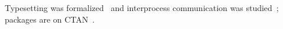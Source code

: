 \documentclass[11pt]{article}\usepackage[paperwidth=14cm,paperheight=8cm,margin=1cm]{geometry}\pagestyle{empty}
\begin{document}
Typesetting was formalized~\autocite{knuth1984} and interprocess communication was studied~\autocite{lamport1986}; packages are on CTAN~\autocite{ctan}.
\printbibliography[heading=none]
\end{document}
